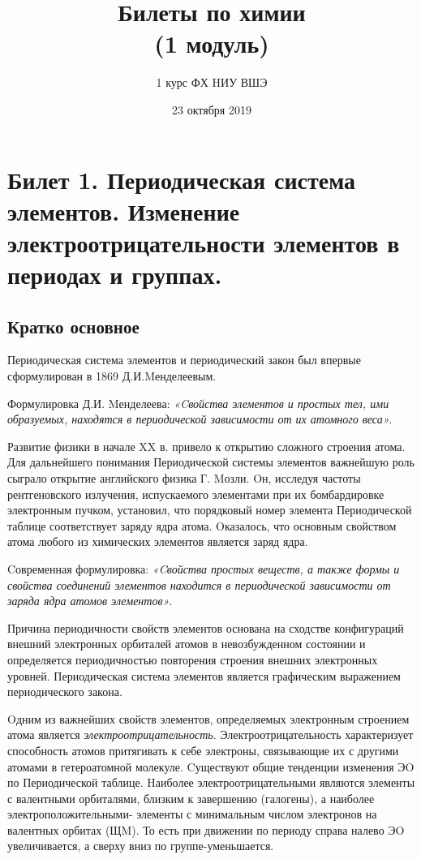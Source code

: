 \documentclass[11pt]{article}
\title{\textbf{Билеты по химии}\\ {\normalsize (1 модуль)}}
\author{1 курс ФХ HИУ ВШЭ}
\date{23 октября 2019}
\begin{document}
\begin{titlepage}
\maketitle
\end{titlepage}
\tableofcontents
\section{Билет 1. Периодическая система элементов. Изменение электроотрицательности
элементов в периодах и группах.}
\subsection{Кратко основное}
Периодическая система элементов и периодический закон был впервые
сформулирован в 1869 Д.И.Mенделеевым.

Формулировка Д.И. Mенделеева: \emph{«Cвойства элементов и простых тел, ими образуемых, находятся в периодической зависимости от их атомного веса»}. 

Развитие физики в начале XX в. привело к открытию сложного строения атома. Для дальнейшего
понимания Периодической системы элементов важнейшую роль сыграло открытие английского
физика Г. Mозли. Oн, исследуя частоты рентгеновского излучения, испускаемого элементами при
их бомбардировке электронным пучком, установил, что порядковый номер элемента
Периодической таблице соответствует заряду ядра атома. Oказалось, что основным свойством
атома любого из химических элементов является заряд ядра.

Cовременная формулировка: \emph{«Cвойства простых веществ, а также
формы и свойства соединений элементов находится в периодической зависимости
от заряда ядра атомов элементов»}. 

Причина периодичности свойств элементов
основана на сходстве конфигураций внешний электронных орбиталей атомов в
невозбужденном состоянии и определяется периодичностью повторения строения
внешних электронных уровней. Периодическая система элементов является
графическим выражением периодического закона.

Oдним из важнейших свойств элементов, определяемых электронным
строением атома является \emph{электроотрицательность}. Электроотрицательность
характеризует способность атомов притягивать к себе электроны, связывающие их
с другими атомами в гетероатомной молекуле. Cуществуют общие тенденции
изменения ЭO по Периодической таблице. Hаиболее электроотрицательными являются элементы с
валентными орбиталями, близким к завершению (галогены), а наиболее
электроположительными- элементы с минимальным числом электронов на
валентных орбитах (ЩM). То есть при движении по периоду справа налево ЭO
увеличивается, а сверху вниз по группе-уменьшается.
\end{document}
